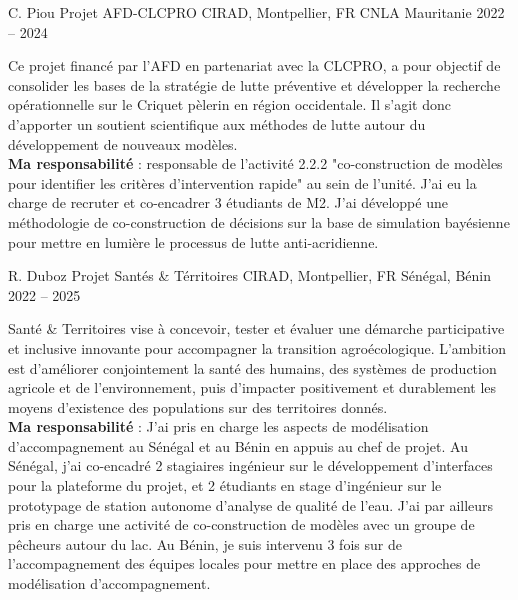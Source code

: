 \begin{cventries}
\cventry
{C. Piou} %
{Projet AFD-CLCPRO} %
{CIRAD, Montpellier, FR \hspace{5em} CNLA Mauritanie} %
{2022 -- 2024} %
{
  \begin{cvitems} %
    Ce projet financé par l'AFD en partenariat avec la CLCPRO, a pour objectif de consolider les bases de la stratégie de lutte préventive et développer la recherche opérationnelle sur le Criquet pèlerin en région occidentale. Il s'agit donc d'apporter un soutient scientifique aux méthodes de lutte autour du développement de nouveaux modèles.\\
    \textbf{Ma responsabilité } : responsable de l'activité 2.2.2 "co-construction de modèles pour identifier les critères d’intervention rapide" au sein de l'unité. J'ai eu la charge de recruter et co-encadrer 3 étudiants de M2. J'ai développé une méthodologie de co-construction de décisions sur la base de simulation bayésienne pour mettre en lumière le processus de lutte anti-acridienne.
  \end{cvitems}
}

\cventry
{R. Duboz} %
{Projet Santés \& Térritoires} %
{CIRAD, Montpellier, FR \hspace{5em} Sénégal, Bénin} %
{2022 -- 2025} %
{
  \begin{cvitems} %
    Santé \& Territoires vise à concevoir, tester et évaluer une démarche participative et inclusive innovante pour accompagner la transition agroécologique. L’ambition est d’améliorer conjointement la santé des humains, des systèmes de production agricole et de l’environnement, puis d’impacter positivement et durablement les moyens d’existence des populations sur des territoires donnés.\\
    \textbf{Ma responsabilité } : J'ai pris en charge les aspects de modélisation d'accompagnement au Sénégal et au Bénin en appuis au chef de projet. Au Sénégal, j'ai co-encadré 2 stagiaires ingénieur sur le développement d'interfaces pour la plateforme du projet, et 2 étudiants en stage d'ingénieur sur le prototypage de station autonome d'analyse de qualité de l'eau. J'ai par ailleurs pris en charge une activité de co-construction de modèles avec un groupe de pêcheurs autour du lac. Au Bénin, je suis intervenu 3 fois sur de l'accompagnement des équipes locales pour mettre en place des approches de modélisation d'accompagnement.
  \end{cvitems}
}


\end{cventries}
